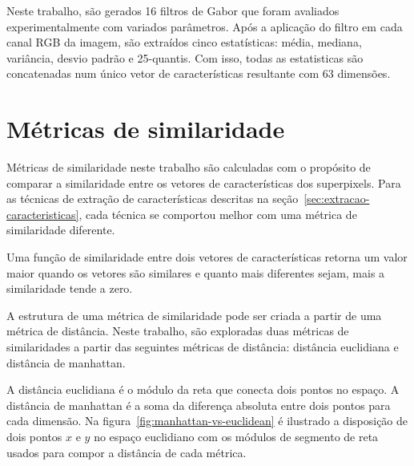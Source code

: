 Neste trabalho, são gerados 16 filtros de Gabor que foram avaliados
experimentalmente com variados parâmetros. Após a aplicação do filtro
em cada canal RGB da imagem, são extraídos cinco estatísticas: média,
mediana, variância, desvio padrão e 25-quantis. Com isso, todas as
estatisticas são concatenadas num único vetor de características
resultante com 63 dimensões.

\section{Métricas de similaridade}\label{sec:teorica-metricas-de-similaridade}


Métricas de similaridade neste trabalho são calculadas com o propósito
de comparar a similaridade entre os vetores de características dos
superpixels. Para as técnicas de extração de características descritas
na seção~\ref{sec:extracao-caracteristicas}, cada técnica se comportou
melhor com uma métrica de similaridade diferente.

Uma função de similaridade entre dois vetores de características
retorna um valor maior quando os vetores são similares e quanto mais
diferentes sejam, mais a similaridade tende a zero.

A estrutura de uma métrica de similaridade pode ser criada a partir de
uma métrica de distância. Neste trabalho, são exploradas duas métricas de
similaridades a partir das seguintes métricas de distância: distância
euclidiana e distância de manhattan.

A distância euclidiana é o módulo da reta que conecta dois pontos no
espaço. A distância de manhattan é a soma da diferença absoluta entre
dois pontos para cada dimensão. Na
figura~\ref{fig:manhattan-vs-euclidean} é ilustrado a disposição de
dois pontos $ x $ e $ y $ no espaço euclidiano com os módulos de
segmento de reta usados para compor a distância de cada métrica.

\begin{figure}[!h]
        \captionsetup{width=8cm}
		\centering
\end{figure}
\FloatBarrier{}


